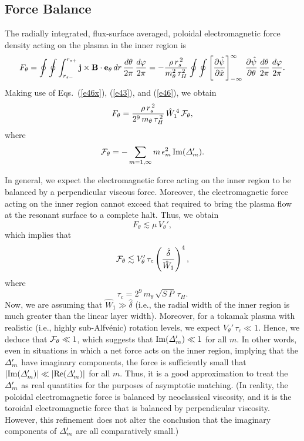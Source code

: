 \documentclass[12pt,prb,aps]{revtex4-1}
\begin{document}
\subsection{Force Balance}
The radially integrated, flux-surface averaged, poloidal electromagnetic force density acting on the
plasma in the inner region is
\begin{equation}
F_\theta = \oint\oint\int_{r_{s-}}^{r_{s+}}{\bf j}\times {\bf B}\cdot {\bf e}_\theta\,dr\,\frac{d\theta}{2\pi}\,\frac{d\varphi}{2\pi} =-\frac{\rho\,r_s^{\,2}}{m_\theta^2\,\tau_H^2}\oint\oint\left[\frac{\partial\hat{\psi}}{\partial\hat{x}}\right]_{-\infty}^\infty\,\frac{\partial\hat{\psi}}{\partial \theta}\,\frac{d\theta}{2\pi}\,\frac{d\varphi}{2\pi}.
\end{equation}
Making use of Eqs.~(\ref{e46x}), (\ref{e43}), and (\ref{e46}), we obtain
\begin{equation}
F_\theta = \frac{\rho\,r_s^{\,2}}{2^9\,m_\theta\,\tau_H^{\,2}}\,\hat{W}_1^{\,4}\,{\cal F}_\theta,
\end{equation}
where
\begin{equation}
{\cal F}_\theta =-\sum_{m=1,\infty}m\,\epsilon_m^2\,{\rm Im}({\mit\Delta}_m').
\end{equation}

In general, we expect the electromagnetic force acting on the inner region to be balanced by a perpendicular viscous force.\cite{rf0} Moreover, the electromagnetic force acting on the inner region cannot exceed that required to bring the plasma flow at the resonant surface to a complete halt.\cite{rf0} Thus, we obtain
\begin{equation}
F_\theta \lesssim \mu\,V_\theta',
\end{equation}
which implies that
\begin{equation}
{\cal F}_\theta \lesssim V_\theta'\,\tau_c\left(\frac{\hat{\delta}}{\hat{W}_1}\right)^4,
\end{equation}
where
\begin{equation}
\tau_c = 2^9\,m_\theta\,\sqrt{S\,P}\,\tau_H.
\end{equation}
Now, we are assuming that $\hat{W}_1\gg \hat{\delta}$ (i.e., the radial width of the inner region is much greater than the linear layer width). Moreover, for a tokamak plasma with realistic (i.e., highly sub-Alfv\'{e}nic) rotation levels, we expect $V_\theta'\,\tau_c\ll 1$. Hence, we deduce that ${\cal F}_\theta\ll 1$, which
suggests that ${\rm Im}({\mit\Delta}_m')\ll 1$ for all $m$. In other words, even in situations in which a net force acts on the
inner region, implying that the ${\mit\Delta}_m'$ have imaginary components, the force is sufficiently small that  $|{\rm Im}({\mit\Delta}_m')|\ll |{\rm Re}({\mit\Delta}_m')|$ for all $m$. 
Thus, it is a good approximation to treat the ${\mit\Delta}_m'$ as real quantities for the purposes of asymptotic matching. 
(In reality, the poloidal electromagnetic force is balanced by neoclassical viscosity, and it is the toroidal electromagnetic force that is balanced by perpendicular viscosity. However, this
refinement does not alter the conclusion that the imaginary components of ${\mit\Delta}_m'$ are all comparatively small.)
\end{document}
